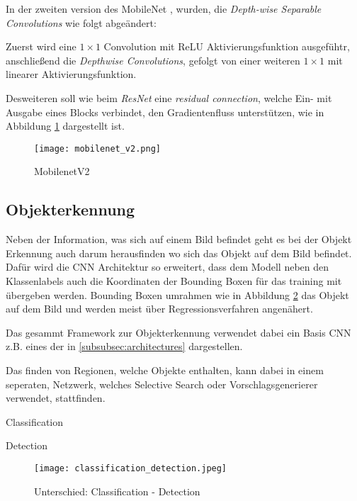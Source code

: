 In der zweiten version des MobileNet
\cite{sandlerMobileNetV2InvertedResiduals2019},
wurden, die \textit{Depth-wise Separable Convolutions}
wie folgt abgeändert:

Zuerst wird eine $1\times1$ Convolution mit ReLU
Aktivierungsfunktion ausgefühtr, anschließend die 
\textit{Depthwise Convolutions}, gefolgt 
von einer weiteren $1\times1$ mit linearer 
Aktivierungsfunktion.


Desweiteren soll wie beim \textit{ResNet} eine 
\textit{residual connection}, welche Ein- mit Ausgabe 
eines Blocks verbindet, 
den Gradientenfluss unterstützen, wie in Abbildung 
\ref{fig:mobilenetv2} dargestellt ist.
\begin{figure}[H]
    \centering
    \texttt{[image: mobilenet\_v2.png]}
    \caption{MobilenetV2}
    \label{fig:mobilenetv2}
\end{figure}


\subsection{Objekterkennung}\label{subsec:objdet_det}

Neben der Information, was sich auf einem Bild befindet geht 
es bei der Objekt Erkennung auch darum herausfinden wo sich das 
Objekt auf dem Bild befindet.
Dafür wird die CNN Architektur so erweitert, dass dem 
Modell neben den Klassenlabels auch die Koordinaten 
der Bounding Boxen für das training mit übergeben werden.
Bounding Boxen umrahmen wie in Abbildung 
\ref{fig:class_vs_det} das Objekt auf dem Bild und 
werden meist über Regressionsverfahren 
angenähert.

Das gesammt Framework zur Objekterkennung 
verwendet dabei ein Basis CNN z.B. eines der in 
\ref{subsubsec:architectures} dargestellen. 

Das finden von Regionen, welche Objekte enthalten, 
kann dabei in einem seperaten, Netzwerk, welches 
Selective Search oder Vorschlagsgenerierer 
verwendet, stattfinden.



\vspace{1cm}
\begin{minipage}{0.5\textwidth}
    \centering
    Classification
\end{minipage}
\begin{minipage}{0.5\textwidth}
    \centering
    Detection
\end{minipage}
\begin{figure}[H]
    \centering
    \texttt{[image: classification\_detection.jpeg]}
    \caption{Unterschied: Classification - Detection}
    \label{fig:class_vs_det}
\end{figure}




